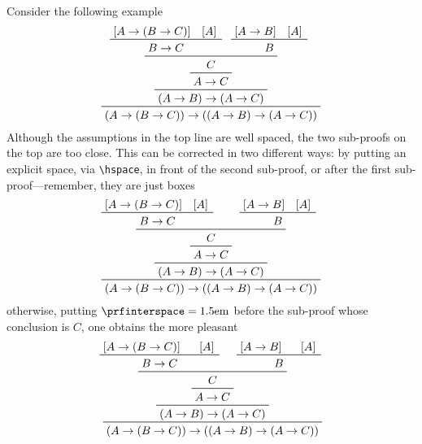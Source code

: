 \documentclass{amsart}
\begin{document}
Consider the following example
\begin{displaymath}
  \prftree
  {\prftree
    {\prftree
      {\prftree
        {\prftree
          {\prfboundedassumption{A \rightarrow (B \rightarrow C)}}
          {\prfboundedassumption{A}}
          {B \rightarrow C}}
        {\prftree
          {\prfboundedassumption{A \rightarrow B}}
          {\prfboundedassumption{A}}
          {B}}
        {C}}
      {A \rightarrow C}}
    {(A \rightarrow B) \rightarrow (A \rightarrow C)}}
  {(A \rightarrow (B \rightarrow C)) \rightarrow ((A \rightarrow B) 
    \rightarrow (A \rightarrow C))} 
\end{displaymath}
Although the assumptions in the top line are well spaced, the two
sub-proofs on the top are too close. This can be corrected in two
different ways: by putting an explicit space, via \verb|\hspace|, in
front of the second sub-proof, or after the first
sub-proof---remember, they are just boxes
\begin{displaymath}
  \prftree
  {\prftree
    {\prftree
      {\prftree
        {\prftree
          {\prfboundedassumption{A \rightarrow (B \rightarrow C)}}
          {\prfboundedassumption{A}}
          {B \rightarrow C}\hspace{1.5em}}
        {\prftree
          {\prfboundedassumption{A \rightarrow B}}
          {\prfboundedassumption{A}}
          {B}}
        {C}}
      {A \rightarrow C}}
    {(A \rightarrow B) \rightarrow (A \rightarrow C)}}
  {(A \rightarrow (B \rightarrow C)) \rightarrow ((A \rightarrow B) 
    \rightarrow (A \rightarrow C))} 
\end{displaymath}
otherwise, putting $\verb|\prfinterspace|=1.5\mathrm{em}$ before the
sub-proof whose conclusion is $C$, one obtains the more pleasant
\begin{displaymath}
  \prftree
  {\prftree
    {\prftree
      {\prfinterspace=1.5em
        \prftree
        {\prftree
          {\prfboundedassumption{A \rightarrow (B \rightarrow C)}}
          {\prfboundedassumption{A}}
          {B \rightarrow C}}
        {\prftree
          {\prfboundedassumption{A \rightarrow B}}
          {\prfboundedassumption{A}}
          {B}}
        {C}}
      {A \rightarrow C}}
    {(A \rightarrow B) \rightarrow (A \rightarrow C)}}
  {(A \rightarrow (B \rightarrow C)) \rightarrow ((A \rightarrow B) 
    \rightarrow (A \rightarrow C))} 
\end{displaymath}\vspace{.2ex}
\end{document}
